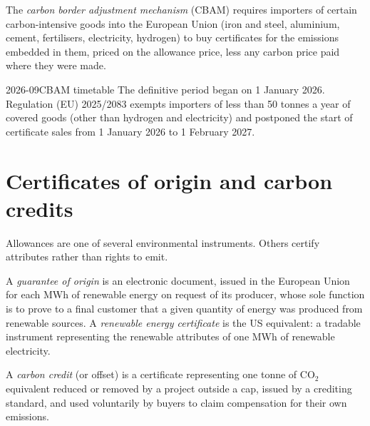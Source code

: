 \begin{definition}\label{def:m3:emissions-and-environmental-markets:cbam}
The \emph{carbon border adjustment mechanism} (CBAM)
requires importers of certain carbon-intensive goods into the European Union (iron and steel,
aluminium, cement, fertilisers, electricity, hydrogen) to buy certificates for the emissions embedded
in them, priced on the allowance price, less any carbon price paid where they were made.
\end{definition}

\begin{dated}{2026-09}{CBAM timetable}\label{dat:m3:emissions-and-environmental-markets:cbam}
The definitive period began on 1 January 2026. Regulation (EU) 2025/2083 exempts importers of less
than 50 tonnes a year of covered goods (other than hydrogen and electricity) and postponed the start
of certificate sales from 1 January 2026 to 1 February 2027.
\end{dated}

\section{Certificates of origin and carbon credits}

Allowances are one of several environmental instruments. Others certify attributes rather than
rights to emit.

\begin{definition}\label{def:m3:emissions-and-environmental-markets:go}
A \emph{guarantee of origin} is an electronic document, issued in the
European Union for each MWh of renewable energy on request of its producer, whose sole function is
to prove to a final customer that a given quantity of energy was produced from renewable sources.
A \emph{renewable energy certificate} is the US equivalent: a
tradable instrument representing the renewable attributes of one MWh of renewable electricity.
\end{definition}

\begin{definition}\label{def:m3:emissions-and-environmental-markets:credit}
A \emph{carbon credit} (or offset) is a certificate representing one tonne of
CO$_2$ equivalent reduced or removed by a project outside a cap, issued by a crediting standard, and
used voluntarily by buyers to claim compensation for their own emissions.
\end{definition}

